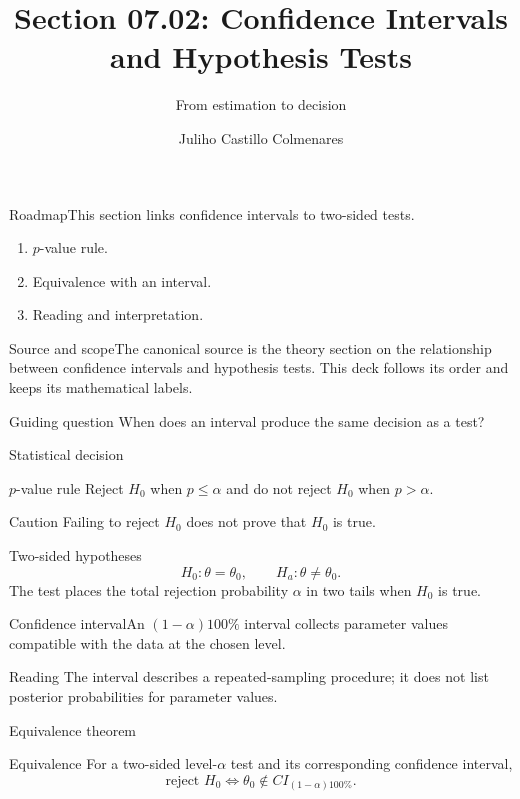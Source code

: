\documentclass[10pt,aspectratio=169]{beamer}
\title[CI and hypothesis tests]{Section 07.02: Confidence Intervals and Hypothesis Tests}
\subtitle{From estimation to decision}
\author[J. Castillo Colmenares]{Juliho Castillo Colmenares}
\institute{Tecnológico de Monterrey}
\date{}
\begin{document}
\begin{frame}[plain]\titlepage\end{frame}
\begin{frame}{Roadmap}\small This section links confidence intervals to two-sided tests.
\begin{enumerate}\item $p$-value rule.\item Equivalence with an interval.\item Reading and interpretation.\end{enumerate}\end{frame}
\begin{frame}{Source and scope}\small The canonical source is the theory section on the relationship between confidence intervals and hypothesis tests. This deck follows its order and keeps its mathematical labels.
\begin{block}{Guiding question} When does an interval produce the same decision as a test?\end{block}\end{frame}
\begin{frame}{Statistical decision}\small
\begin{block}{$p$-value rule} Reject $H_0$ when $p\leq\alpha$ and do not reject $H_0$ when $p>\alpha$.\end{block}
\begin{alertblock}{Caution} Failing to reject $H_0$ does not prove that $H_0$ is true.\end{alertblock}\end{frame}
\begin{frame}{Two-sided hypotheses}\small\[H_0:\theta=\theta_0,\qquad H_a:\theta\neq\theta_0.\]
The test places the total rejection probability $\alpha$ in two tails when $H_0$ is true.\end{frame}
\begin{frame}{Confidence interval}\small An $(1-\alpha)100\%$ interval collects parameter values compatible with the data at the chosen level.
\begin{block}{Reading} The interval describes a repeated-sampling procedure; it does not list posterior probabilities for parameter values.\end{block}\end{frame}
\begin{frame}{Equivalence theorem}\small
\begin{block}{Equivalence}
For a two-sided level-$\alpha$ test and its corresponding confidence interval,
\[\text{reject }H_0\Longleftrightarrow \theta_0\notin CI_{(1-\alpha)100\%}.\]
\end{block}\end{frame}
\end{document}
